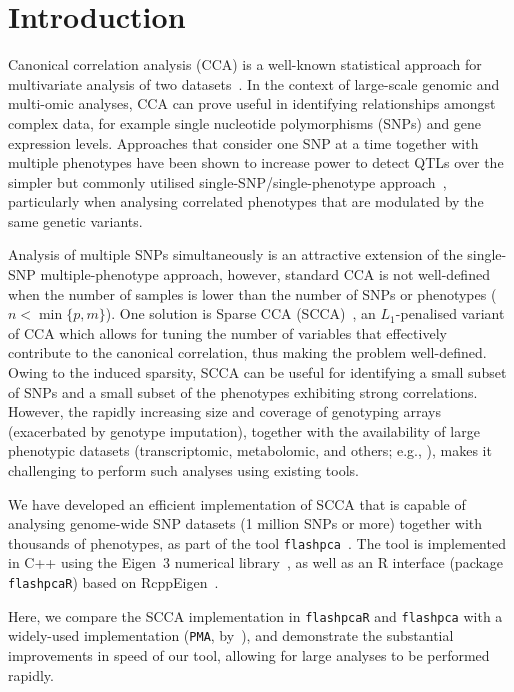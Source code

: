 
\section{Introduction}

Canonical correlation analysis (CCA) is a well-known statistical approach
for multivariate analysis of two datasets~\citep{Hotelling1936}. In the
context of large-scale genomic and multi-omic analyses, CCA can prove useful
in identifying relationships amongst complex data, for example single
nucleotide polymorphisms (SNPs) and gene expression levels. Approaches
that consider one SNP at a time together with multiple phenotypes have
been shown to increase power to detect QTLs over the simpler but commonly
utilised single-SNP/single-phenotype approach~\citep{Ferreira2009,Inouye2012},
particularly when analysing correlated phenotypes that are modulated by the
same genetic variants.

Analysis of multiple SNPs simultaneously is an attractive extension of
the single-SNP multiple-phenotype approach, however, standard CCA is
not well-defined when the number of samples is lower than the number
of SNPs or phenotypes ($n{<}\min\{p, m\}$).  One solution is Sparse
CCA (SCCA)~\citep{Witten2009cshort,Witten2009bshort,Parkhomenko2009},
an $L_1$-penalised variant of CCA which allows for tuning the number of
variables that effectively contribute to the canonical correlation, thus
making the problem well-defined. Owing to the induced sparsity, SCCA can
be useful for identifying a small subset of SNPs and a small subset of the
phenotypes exhibiting strong correlations.  However, the rapidly increasing
size and coverage of genotyping arrays (exacerbated by genotype imputation),
together with the availability of large phenotypic datasets (transcriptomic,
metabolomic, and others; e.g., \citet{Bartel2015,TheGTExConsortium2015}),
makes it challenging to perform such analyses using existing tools.

We have developed an efficient implementation of SCCA that is
capable of analysing genome-wide SNP datasets (1 million SNPs
or more) together with thousands of phenotypes, as part of the tool
\texttt{flashpca}~\citep{Abraham2014}. The tool is implemented in \textsf{C++}
using the Eigen~3 numerical library~\citep{eigenweb}, as well as an \textsf{R}
interface (package \texttt{flashpcaR}) based on RcppEigen~\citep{Bates2013}.

Here, we compare the SCCA implementation in \texttt{flashpcaR} and
\texttt{flashpca} with a widely-used implementation (\texttt{PMA},
by~\citet{Witten2013short}), and demonstrate the substantial improvements
in speed of our tool, allowing for large analyses to be performed rapidly.

